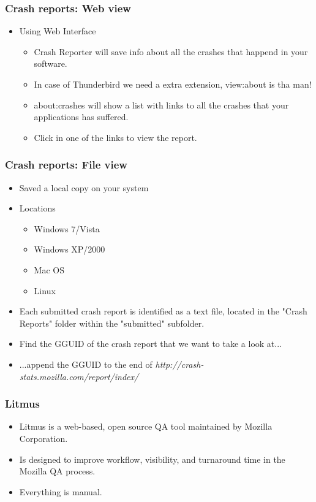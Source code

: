 \documentclass{beamer}
\begin{document}
\begin{frame}
\frametitle{Crash reports: Web view}
 \begin{itemize}
  \item Using Web Interface
     \begin{itemize}
       \item Crash Reporter will save info about all the crashes that happend in your software.
       \item In case of Thunderbird we need a extra extension, view:about is tha man!
       \item about:crashes will show a list with links to all the crashes that your applications has suffered.
       \item Click in one of the links to view the report.
     \end{itemize}
 \end{itemize}
\end{frame}


\begin{frame}
\frametitle{Crash reports: File view}
 \begin{itemize}
  \item Saved a local copy on your system
  \item Locations
    \begin{itemize}
      \item Windows 7/Vista
      \item Windows XP/2000
      \item Mac OS
      \item Linux
    \end{itemize}
  \item Each submitted crash report is identified as a text file, located in the "Crash Reports" folder within the "submitted" subfolder.
  \item Find the GGUID of the crash report that we want to take a look at...
  \item ...append the GGUID to the end of \textit{http://crash-stats.mozilla.com/report/index/}
 \end{itemize}
\end{frame}



\begin{frame}
\frametitle{Litmus}
 \begin{itemize}
    \item Litmus is a web-based, open source QA tool maintained by Mozilla Corporation.
    \item Is designed to improve workflow, visibility, and turnaround time in the Mozilla QA process.
    \item Everything is manual.
 \end{itemize}

\end{frame}
\end{document}
